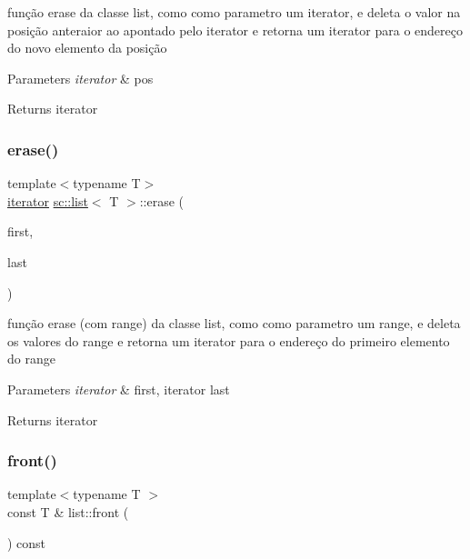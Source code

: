 função erase da classe list, como como parametro um iterator, e deleta o valor na posição anteraior ao apontado pelo iterator e retorna um iterator para o endereço do novo elemento da posição 
\begin{DoxyParams}{Parameters}
{\em iterator} & pos \\
\hline
\end{DoxyParams}
\begin{DoxyReturn}{Returns}
iterator 
\end{DoxyReturn}
\mbox{\label{classsc_1_1list_ae796301c82f58d72d10ec7c30fb0b024}} 
\subsubsection{\texorpdfstring{erase()}{erase()}\hspace{0.1cm}{\footnotesize\ttfamily [2/2]}}
{\footnotesize\ttfamily template$<$typename T$>$ \\
\mbox{\hyperlink{classsc_1_1list_1_1iterator}{iterator}} \mbox{\hyperlink{classsc_1_1list}{sc\+::list}}$<$ T $>$\+::erase (\begin{DoxyParamCaption}\item[{\mbox{\hyperlink{classsc_1_1list_1_1iterator}{iterator}}}]{first,  }\item[{\mbox{\hyperlink{classsc_1_1list_1_1iterator}{iterator}}}]{last }\end{DoxyParamCaption})}

função erase (com range) da classe list, como como parametro um range, e deleta os valores do range e retorna um iterator para o endereço do primeiro elemento do range 
\begin{DoxyParams}{Parameters}
{\em iterator} & first, iterator last \\
\hline
\end{DoxyParams}
\begin{DoxyReturn}{Returns}
iterator 
\end{DoxyReturn}
\mbox{\label{classsc_1_1list_a15e1380ab91bf786fa4b34b802d66c0b}} 
\subsubsection{\texorpdfstring{front()}{front()}}
{\footnotesize\ttfamily template$<$typename T $>$ \\
const T \& list\+::front (\begin{DoxyParamCaption}{ }\end{DoxyParamCaption}) const}


